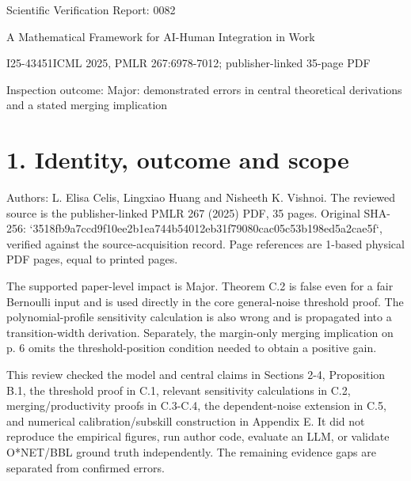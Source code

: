 \documentclass[10pt]{article}
\begin{document}
Scientific Verification Report: 0082\par
A Mathematical Framework for AI-Human Integration in Work\par
I25-43451ICML 2025, PMLR 267:6978-7012; publisher-linked 35-page PDF\par
Inspection outcome: Major: demonstrated errors in central theoretical derivations and a stated merging implication\par
\section*{1. Identity, outcome and scope}
Authors: L. Elisa Celis, Lingxiao Huang and Nisheeth K. Vishnoi. The reviewed source is the publisher-linked PMLR 267 (2025) PDF, 35 pages. Original SHA-256: `3518fb9a7ccd9f10ee2b1ea744b54012eb31f79080cac05c53b198ed5a2cae5f`, verified against the source-acquisition record. Page references are 1-based physical PDF pages, equal to printed pages.\par
The supported paper-level impact is Major. Theorem C.2 is false even for a fair Bernoulli input and is used directly in the core general-noise threshold proof. The polynomial-profile sensitivity calculation is also wrong and is propagated into a transition-width derivation. Separately, the margin-only merging implication on p. 6 omits the threshold-position condition needed to obtain a positive gain.\par
This review checked the model and central claims in Sections 2-4, Proposition B.1, the threshold proof in C.1, relevant sensitivity calculations in C.2, merging/productivity proofs in C.3-C.4, the dependent-noise extension in C.5, and numerical calibration/subskill construction in Appendix E. It did not reproduce the empirical figures, run author code, evaluate an LLM, or validate O*NET/BBL ground truth independently. The remaining evidence gaps are separated from confirmed errors.\par
\end{document}
